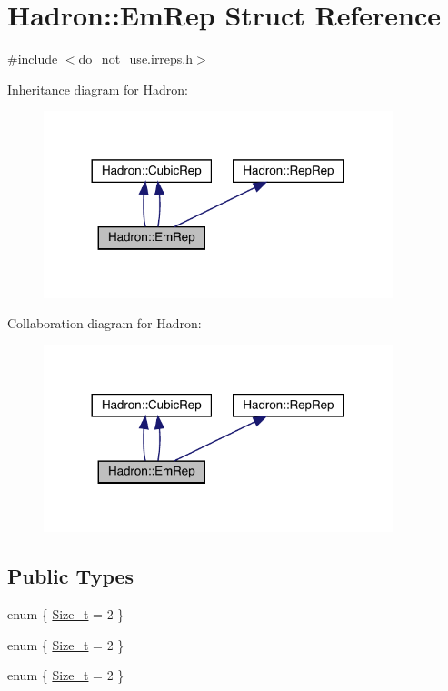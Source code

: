 \hypertarget{structHadron_1_1EmRep}{}\section{Hadron\+:\+:Em\+Rep Struct Reference}
\label{structHadron_1_1EmRep}


{\ttfamily \#include $<$do\+\_\+not\+\_\+use.\+irreps.\+h$>$}



Inheritance diagram for Hadron\+:\nopagebreak
\begin{figure}[H]
\begin{center}
\leavevmode
\includegraphics[width=288pt]{d9/d56/structHadron_1_1EmRep__inherit__graph}
\end{center}
\end{figure}


Collaboration diagram for Hadron\+:\nopagebreak
\begin{figure}[H]
\begin{center}
\leavevmode
\includegraphics[width=288pt]{db/d39/structHadron_1_1EmRep__coll__graph}
\end{center}
\end{figure}
\subsection*{Public Types}
\begin{DoxyCompactItemize}
\item 
enum \{ \mbox{\hyperlink{structHadron_1_1EmRep_a2d0263f8a0de5733964f7da4c0bfc009a623644658daf44b84d24cef484208987}{Size\+\_\+t}} = 2
 \}
\item 
enum \{ \mbox{\hyperlink{structHadron_1_1EmRep_a2d0263f8a0de5733964f7da4c0bfc009a623644658daf44b84d24cef484208987}{Size\+\_\+t}} = 2
 \}
\item 
enum \{ \mbox{\hyperlink{structHadron_1_1EmRep_a2d0263f8a0de5733964f7da4c0bfc009a623644658daf44b84d24cef484208987}{Size\+\_\+t}} = 2
 \}
\end{DoxyCompactItemize}
